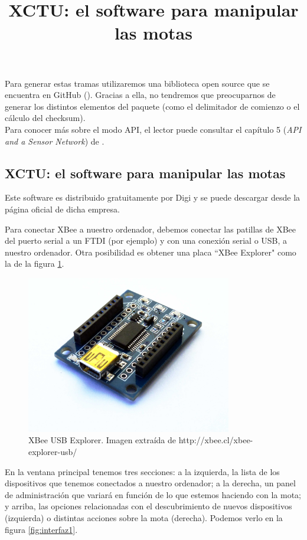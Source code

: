 Para generar estas tramas utilizaremos una biblioteca open source que se encuentra en GitHub (\cite{libraryArduinoXBee}).
Gracias a ella, no tendremos que preocuparnos de generar los distintos elementos del paquete
(como el delimitador de comienzo o el cálculo del checksum).\\

Para conocer más sobre el modo API, el lector puede consultar el capítulo 5 (\textit{API and a Sensor Network}) de \cite{faludi}.\\

\subsection{XCTU: el software para manipular las motas}
\title{XCTU: el software para manipular las motas}
Este software es distribuido gratuitamente por Digi \cite{licenciaXCTU} y se puede descargar desde la página oficial
de dicha empresa.

Para conectar XBee a nuestro ordenador, debemos conectar las patillas de XBee del puerto serial a un
FTDI (por ejemplo) y con una conexión serial o USB, a nuestro ordenador. Otra posibilidad es obtener
una placa ``XBee Explorer" como la de la figura \ref{fig:xbeeexplorer}.


\begin{figure}[htb]
\centering
\includegraphics[width=0.8\textwidth]{./imagenes/xbeeexplorer}
\caption{XBee USB Explorer. Imagen extraída de \scriptsize{http://xbee.cl/xbee-explorer-usb/}} \label{fig:xbeeexplorer}
\end{figure}


En la ventana principal tenemos tres secciones: a la izquierda, la lista de los dispositivos
que tenemos conectados a nuestro ordenador; a la derecha, un panel de administración que variará
en función de lo que estemos haciendo con la mota; y arriba, las opciones relacionadas con el descubrimiento
de nuevos dispositivos (izquierda) o distintas acciones sobre la mota (derecha). Podemos verlo en la figura \ref{fig:interfaz1}.\\

